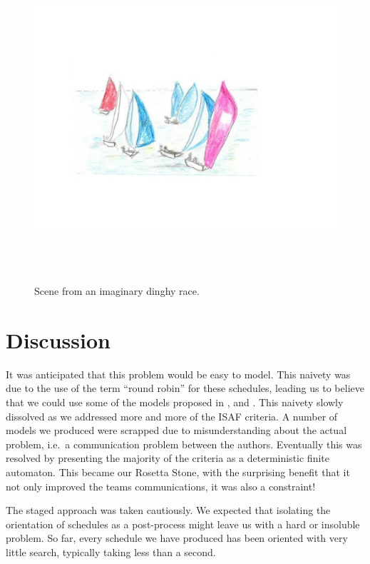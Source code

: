 \documentclass{llncs}
\begin{document}
\begin{center}
\begin{figure}[tb]
\hspace{-1cm}
\includegraphics[height=12cm,width=17.5cm]{dinghy.jpg}
\vspace{-30mm}
\caption{Scene from an imaginary dinghy race.}
\label{dinghy}
\end{figure}
\end{center}

\section{Discussion}

It was anticipated that this problem would be easy to model. This naivety was due to the use of the
term ``round robin'' for these schedules, leading us to believe that we could use some of the models
proposed in \cite{trick2002}, \cite{trick2008} and \cite{henz2004}. This naivety slowly dissolved as
we addressed more and more of the ISAF criteria. A number of models we produced were scrapped due to
misunderstanding about the actual problem, i.e.\ a communication problem between the authors.
Eventually this was resolved by presenting the majority of the criteria as a deterministic finite
automaton. This became our Rosetta Stone, with the surprising benefit that it not only improved the
teams communications, it was also a constraint!

The staged approach was taken cautiously. We expected that isolating the orientation of schedules as
a post-process might leave us with a hard or insoluble problem. So far, every schedule we have
produced has been oriented with very little search, typically taking less than a second.
\end{document}
